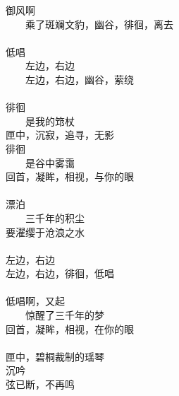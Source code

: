 御风啊 \\
　　乘了斑斓文豹，幽谷，徘徊，离去 \\
\\
低唱 \\
　　左边，右边 \\
　　左边，右边，幽谷，萦绕 \\
\\
徘徊 \\
　　是我的筇杖 \\
匣中，沉寂，追寻，无影 \\
徘徊 \\
　　是谷中雾霭 \\
回首，凝眸，相视，与你的眼 \\
\\
漂泊 \\
　　三千年的积尘 \\
要濯缨于沧浪之水 \\
\\
左边，右边 \\
左边，右边，徘徊，低唱 \\
\\
低唱啊，又起 \\
　　惊醒了三千年的梦 \\
回首，凝眸，相视，在你的眼 \\
\\
匣中，碧桐裁制的瑶琴 \\
沉吟 \\
弦已断，不再鸣
